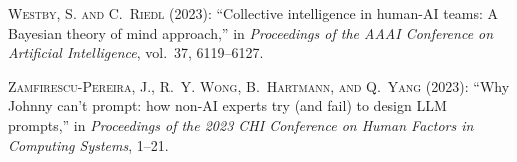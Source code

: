 \begin{thebibliography}{1}
\textsc{Westby, S. and C.~Riedl} (2023): \enquote{Collective intelligence in human-AI teams: A Bayesian theory of mind approach,} in \emph{Proceedings of the AAAI Conference on Artificial Intelligence}, vol.~37, 6119--6127.

\textsc{Zamfirescu-Pereira, J., R.~Y. Wong, B.~Hartmann, and Q.~Yang} (2023): \enquote{Why Johnny can’t prompt: how non-AI experts try (and fail) to design LLM prompts,} in \emph{Proceedings of the 2023 CHI Conference on Human Factors in Computing Systems}, 1--21.\end{thebibliography}
